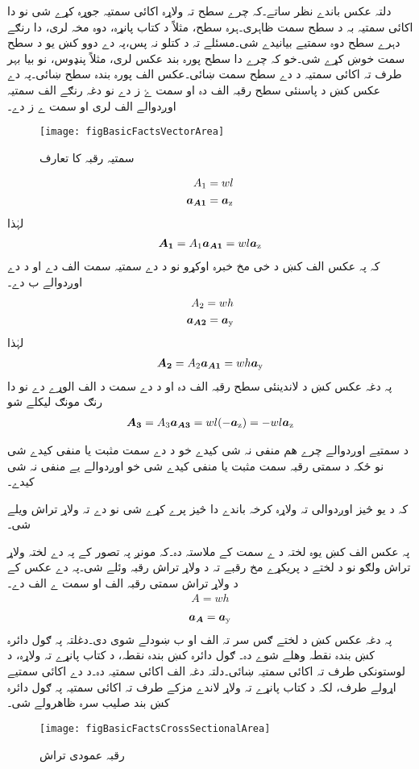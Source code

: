 دلتہ عکس باندے نظر ساتے۔کہ چرے سطح تہ ولاړہ  اکائی سمتیہ جوړہ کړے شی نو دا اکائی سمتیہ بہ د سطح سمت ظاہری۔ہرہ سطح، مثلاً د کتاب  پانړہ،  دوہ مخہ لری، دا رنګے دہرے سطح دوہ سمتیے بیانیدے شی۔مسئلے تہ د کتلو نہ پس،پہ   دے دوو کښ یو د سطح سمت خوښ کړے شی۔خو کہ چرے دا سطح پورہ بند عکس لری، مثلاً پنډوس، نو بیا بہر طرف تہ اکائی سمتیہ د دے سطح سمت ښائی۔عکس الف پورہ بندہ سطح ښائی۔پہ دے عکس کښ د پاسنئی سطح رقبہ الف دہ او سمت ۓ  ز دے نو دغہ رنګے الف سمتیہ اوږدوالے الف لری او سمت ے ز دے۔ 
\begin{figure}
\centering
\texttt{[image: figBasicFactsVectorArea]}
\caption{سمتیہ رقبہ کا تعارف‬}
\label{شکل_حقائق_رقبہ_سمتیہ}
\end{figure}
%
\begin{align*}
A_1&=wl\\
{{\boldsymbol{a_{A1}}}}&={\boldsymbol{a}}_{\textup{z}}
\end{align*}
لہٰذا
\begin{align}
{\ensuremath{{\boldsymbol{A_1}}}}=A_1 {{\boldsymbol{a_{A1}}}}= w l {\boldsymbol{a}}_{\textup{z}}
\end{align}
کہ پہ عکس الف کښ د خی مخ خبرہ اوکړو نو د دے سمتیہ سمت  الف دے او د دے اوږدوالے ب دے۔
\begin{align*}
A_2=wh\\
{{\boldsymbol{a_{A2}}}}={\boldsymbol{a}}_{\textup{y}}
\end{align*}
لہٰذا
\begin{align}
{\ensuremath{{\boldsymbol{A_2}}}}=A_2 {{\boldsymbol{a_{A1}}}}=w h {\boldsymbol{a}}_{\textup{y}}
\end{align}
پہ دغہ عکس کښ د لاندینئی سطح رقبہ الف دہ او د دے سمت د الف الوړے دے نو دا رنګ مونګ لیکلے شو  
\begin{align}
{\ensuremath{{\boldsymbol{A_3}}}}=A_3 {{\boldsymbol{a_{A3}}}}=wl (-{\boldsymbol{a}}_{\textup{z}})=-wl {\boldsymbol{a}}_{\textup{z}}
\end{align}

د سمتیے اوږدوالے چرے ھم منفی نہ شی کیدے خو د دے سمت مثبت یا منفی کیدے شی نو ځکہ د سمتی رقبہ سمت مثبت یا منفی کیدے شی خو اوږدوالے یے منفی نہ شی کیدے۔


کہ د یو څیز اوږدوالی تہ ولاړہ کرخہ  باندے دا څیز پرے کړے شی نو دے تہ ولاړ تراش ویلے شی۔  

پہ عکس الف کښ یوہ لختہ د ے سمت کے ملاستہ  دہ۔کہ مونږ پہ تصور کے پہ دے لختہ ولاړ تراش ولګو نو د لختے د پریکړے مخ رقبے تہ د ولاړ تراش رقبہ وئلے شی۔پہ دے عکس کے د ولاړ تراش سمتی رقبہ الف او سمت ے الف دے۔
\begin{align}
A=wh
\end{align}
%
\begin{align}
{\ensuremath{{\boldsymbol{a_A}}}}={\boldsymbol{a}}_{\textup{y}}
\end{align}
پہ دغہ عکس کښ د لختے ګس سر تہ الف او ب ښودلے شوی دی۔دغلتہ پہ ګول دائرہ کښ بندہ نقطہ وھلے شوے دہ۔ ګول دائرہ کښ بندہ نقطہ، د کتاب پانړے تہ ولاړہ، د لوستونکی طرف تہ اکائی سمتیہ ښائی۔دلتہ دغہ الف اکائی سمتیہ دہ۔د دے اکائی سمتیے اړولے طرف، لکہ د کتاب  پانړے تہ ولاړ لاندے مزکے طرف تہ اکائی سمتیہ پہ ګول دائرہ کښ بند صلیب سرہ ظاھرولے شی۔
\begin{figure}
\centering
\texttt{[image: figBasicFactsCrossSectionalArea]}
\caption{رقبہ  عمودی تراش}
\label{شکل_حقائق_رقبہ_عمودی}
\end{figure}


